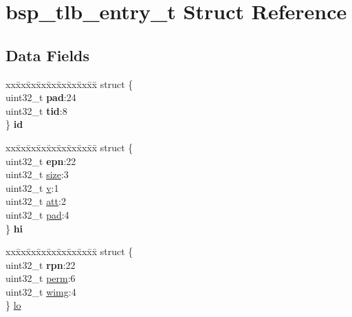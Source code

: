 \hypertarget{structbsp__tlb__entry__t}{}\section{bsp\+\_\+tlb\+\_\+entry\+\_\+t Struct Reference}
\label{structbsp__tlb__entry__t}
\subsection*{Data Fields}
\begin{DoxyCompactItemize}
\item 
\mbox{\label{structbsp__tlb__entry__t_aac76c0a4abea21db5ec17da816b6b1d8}} 
\begin{tabbing}
xx\=xx\=xx\=xx\=xx\=xx\=xx\=xx\=xx\=\kill
struct \{\\
\>uint32\_t {\bfseries pad}:24\\
\>uint32\_t {\bfseries tid}:8\\
\} {\bfseries id}\\

\end{tabbing}\item 
\mbox{\label{structbsp__tlb__entry__t_af1567c32f2d221f4383abec4db1ec056}} 
\begin{tabbing}
xx\=xx\=xx\=xx\=xx\=xx\=xx\=xx\=xx\=\kill
struct \{\\
\>uint32\_t {\bfseries epn}:22\\
\>uint32\_t \mbox{\hyperlink{structbsp__tlb__entry__t_a1315440aa4e0419c651bf0d78ca815ee}{size}}:3\\
\>uint32\_t \mbox{\hyperlink{structbsp__tlb__entry__t_ac5250e55576956fca7761e1e2f746f61}{v}}:1\\
\>uint32\_t \mbox{\hyperlink{structbsp__tlb__entry__t_a9b3a9e52b01ba5da0ac7c5da5593add0}{att}}:2\\
\>uint32\_t \mbox{\hyperlink{structbsp__tlb__entry__t_abb4d4dec5f523e8e175ba5a0b5234008}{pad}}:4\\
\} {\bfseries hi}\\

\end{tabbing}\item 
\begin{tabbing}
xx\=xx\=xx\=xx\=xx\=xx\=xx\=xx\=xx\=\kill
struct \{\\
\>uint32\_t {\bfseries rpn}:22\\
\>uint32\_t \mbox{\hyperlink{structbsp__tlb__entry__t_a8c46278e8baed84441f12cc53b259f99}{perm}}:6\\
\>uint32\_t \mbox{\hyperlink{structbsp__tlb__entry__t_a2c0a0e41283a1a068722a6b8458ec6db}{wimg}}:4\\
\} \mbox{\hyperlink{structbsp__tlb__entry__t_a657df6e353bf882caf581f9977fc046d}{lo}}\\


\end{tabbing}
\end{DoxyCompactItemize}
